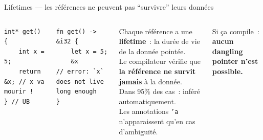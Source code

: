 \documentclass[aspectratio=169, 10pt]{beamer}
\newcommand{\rust}[1]{\texttt{#1}}
\begin{document}
\begin{frame}[fragile]{Lifetimes --- les références ne peuvent pas ``survivre'' leurs données}
  \begin{columns}[t]
    \begin{tcolorbox}[dangerbox, title={\faSkull\ C~: dangling pointer silencieux}]
      \begin{verbatim}
int* get() {
    int x = 5;
    return &x; // x va mourir !
} // UB
      \end{verbatim}
    \end{tcolorbox}
    \vspace{0.3em}
    \begin{tcolorbox}[safebox, title={\faRust\ Rust~: erreur de compilation}]
      \begin{verbatim}
fn get() -> &i32 {
    let x = 5;
    &x
// error: `x` does not live long enough
}
      \end{verbatim}
    \end{tcolorbox}

    \begin{tcolorbox}[notebox, title={\faBook\ Concept de Lifetime}]
      \small
      Chaque référence a une \textbf{lifetime}~: la durée de vie de la donnée pointée.\\[0.5em]
      Le compilateur vérifie que \textbf{la référence ne survit jamais} à la donnée.\\[0.5em]
      Dans 95\% des cas~: inféré automatiquement.\\[0.5em]
      Les annotations \rust{'a} n'apparaissent qu'en cas d'ambiguïté.
    \end{tcolorbox}
    \vspace{0.3em}
    \begin{tcolorbox}[safebox, title={\faCheckCircle\ Garantie}]
      \small Si ça compile~:\\
      \textbf{aucun dangling pointer n'est possible.}
    \end{tcolorbox}
  \end{columns}
\end{frame}
\end{document}
